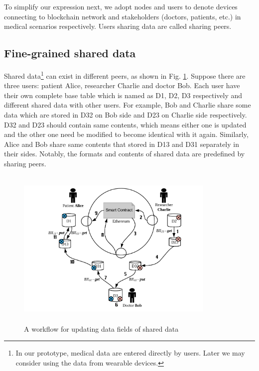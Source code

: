 \documentclass[conference]{IEEEtran}
\begin{document}
     
     To simplify our expression next, we adopt nodes and users to denote devices connecting to blockchain network and stakeholders (doctors, patients, etc.) in medical scenarios respectively. Users sharing data are called sharing peers.
     
\subsection{Fine-grained shared data}
\label{fine-grained}


Shared data\footnote{In our prototype, medical data are entered directly by users. Later we may consider using the data from wearable devices.} can exist in different peers, as shown in Fig. \ref{workflow}.  Suppose there are three users: patient Alice, researcher Charlie and doctor Bob. Each user have their own complete base table which is named as D1, D2, D3 respectively and different shared data with other users. For example, Bob and Charlie share some data which are stored in D32 on Bob side and D23 on Charlie side respectively. D32 and D23 should contain same contents, which means either one is updated and the other one need be modified to become identical with it again. Similarly, Alice and Bob share same contents that stored in D13 and D31 separately in their sides. Notably, the formats and contents of shared data are predefined by sharing peers. 

\begin{figure}[htbp]
	\centerline{\includegraphics[width=270pt,height=220pt]{updateScenario.pdf}}
	\caption{A workflow for updating data fields of shared data}
	\label{workflow}
\end{figure}
\end{document}
